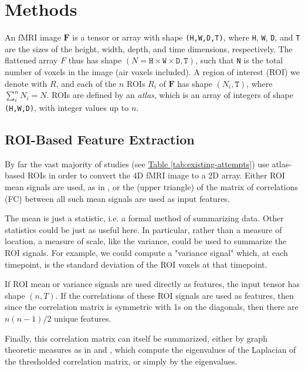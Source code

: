 \documentclass[10pt]{article}
\begin{document}
\section{Methods} \label{sec:methods}


An fMRI image \(\bm{F}\) is a tensor or array with shape \texttt{(H,W,D,T)}, where \texttt{H},
\texttt{W}, \texttt{D}, and \texttt{T} are the sizes of the height, width, depth, and time
dimensions, respectively. The flattened array \(F\) thus has shape \((N = \texttt{H} \times
\texttt{W} \times \texttt{D}, \texttt{T})\), such that \texttt{N} is the total number of voxels in
the image (air voxels included). A region of interest (ROI) we denote with \(R\), and each of the
\(n\) ROIs \(R_i\) of \(\bm{F}\) has shape \((N_i, \texttt{T})\), where \(\sum_i^n N_i= N\). ROIs
are defined by an \emph{atlas}, which is an array of integers of shape \texttt{(H,W,D)}, with
integer values up to \(n\).


\subsection{ROI-Based Feature Extraction}

By far the vast majority of studies (see \hyperref[tab:existing-attempts]{Table
\ref{tab:existing-attempts}}) use atlas-based ROIs in order to convert the 4D fMRI image to a 2D
array. Either ROI mean signals are used, as in \citet{el-gazzarHybrid3DCNN3DCLSTM2019}, or the
(upper triangle) of the matrix of correlations (FC) between all such mean signals are used as input
features.

The mean is just a statistic, i.e. a formal method of summarizing data. Other statistics could be
just as useful here. In particular, rather than a measure of location, a measure of scale, like the
variance, could be used to summarize the ROI signals. For example, we could compute a "variance
signal" which, at each timepoint, is the standard deviation of the ROI voxels at that timepoint.

If ROI mean or variance signals are used directly as features, the input tensor has shape \((n,
T)\). If the correlations of these ROI signals are used as features, then since the correlation
matrix is symmetric with 1s on the diagonals, then there are \(n(n-1)/2\) unique features.

Finally, this correlation matrix can itself be summarized, either by graph theoretic measures as in
\citet{yinDiagnosisAutismSpectrum2021} and \citet{mostafaDiagnosisAutismSpectrum2019}, which compute
the eigenvalues of the Laplacian of the thresholded correlation matrix, or simply by the
eigenvalues.
\end{document}
